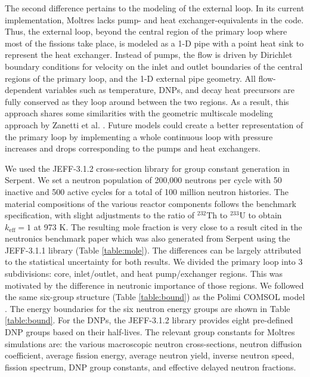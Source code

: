 The second difference pertains to the modeling of the external loop. In its
current implementation, Moltres lacks pump- and heat exchanger-equivalents in
the code. Thus, the external loop, beyond the central region of the primary
loop where most of the fissions take place, is modeled as a 1-D pipe with a
point heat sink to represent the heat exchanger. Instead of pumps, the flow is
driven by Dirichlet boundary conditions for velocity on the inlet and outlet
boundaries of the central regions of the primary loop, and the 1-D external
pipe geometry. All flow-dependent variables such as temperature, \glspl{DNP},
and decay heat precursors are fully conserved as they loop around between the
two regions. As a result, this approach shares some similarities with the
geometric multiscale modeling approach by Zanetti et al.
\cite{zanetti_geometric_2015}. Future models could
create a better representation of the primary loop by implementing a whole
continuous loop with pressure increases and drops corresponding to the pumps
and heat exchangers. 

We used the JEFF-3.1.2 cross-section library \cite{oecd/nea_jeff-3.1.2_2014}
for group constant generation in
Serpent. We set a neutron population of 200,000 neutrons per cycle with 50
inactive and 500 active cycles for a total of 100 million neutron histories.
The material compositions of the various reactor components follows the
benchmark specification, with slight adjustments to the
ratio of $^{232}$Th to $^{233}$U to obtain $k_{\text{eff}}=1$ at 973 K. The
resulting mole fraction is very close to a result cited in the neutronics
benchmark paper which was also generated from Serpent using the JEFF-3.1.1
library (Table \ref{table:mole}). The differences can be largely attributed to
the statistical uncertainty for both results. We divided the primary loop into
3 subdivisions: core, inlet/outlet, and heat pump/exchanger regions. This was
motivated by the difference in neutronic importance of those regions. We
followed the same six-group
structure (Table \ref{table:bound}) as the Polimi COMSOL model
\cite{fiorina_modelling_2014}. The
energy boundaries for the six neutron energy groups are shown in Table
\ref{table:bound}. For the \glspl{DNP}, the JEFF-3.1.2 library provides
eight pre-defined \gls{DNP} groups based on their half-lives. The relevant
group constants for Moltres simulations are: the various macroscopic neutron
cross-sections, neutron diffusion coefficient, average fission energy, average
neutron yield, inverse neutron speed, fission spectrum, \gls{DNP} group
constants, and effective delayed neutron fractions.

